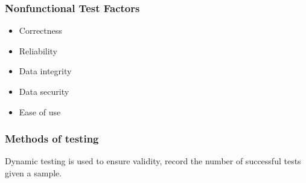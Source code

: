 \documentclass[12pt]{article}
\begin{document}
\subsubsection{Nonfunctional Test Factors}
\begin{itemize}
  \item Correctness 
  \item Reliability 
  \item Data integrity 
  \item Data security 
  \item Ease of use
 \end{itemize} 

\subsubsection{Methods of testing}
Dynamic testing is used to ensure validity, record the number of successful tests given a sample.
\end{document}
